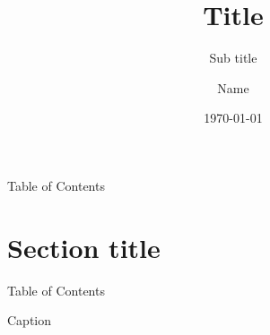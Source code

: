 \documentclass[aspectratio=169, dvipdfmx]{beamer}
\title[Short title]{Title}
\subtitle{Sub title}
\author[Short name]{Name}
\date{\today}
\begin{document}
\maketitle

\begin{frame}{Table of Contents}
    \tableofcontents
\end{frame}

\section{Section title}
\begin{frame}{Table of Contents}
    \tableofcontents[currentsection]
\end{frame}

\begin{frame}{Caption}
\end{frame}
\end{document}

